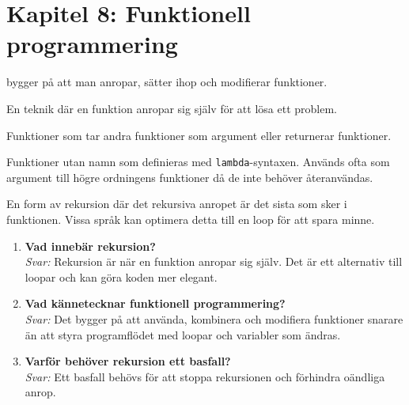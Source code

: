 \documentclass[11pt,a4paper]{article}
\begin{document}
\section{Kapitel 8: Funktionell programmering}

\begin{description}[style=nextline, leftmargin=1cm, labelindent=0.5cm]
    \item[\color{primary}Funktionell programmering] bygger på att man anropar, sätter ihop och modifierar funktioner.
    \item[\color{primary}Rekursion] En teknik där en funktion anropar sig själv för att lösa ett problem.
    \item[\color{primary}Högre ordningens funktioner] Funktioner som tar andra funktioner som argument eller returnerar funktioner.
    \item[\color{primary}Anonyma funktioner (lambda)] Funktioner utan namn som definieras med \texttt{lambda}-syntaxen. Används ofta som argument till högre ordningens funktioner då de inte behöver återanvändas.
    \item[\color{primary}Svansrekursion] En form av rekursion där det rekursiva anropet är det sista som sker i funktionen. Vissa språk kan optimera detta till en loop för att spara minne.
\end{description}

\begin{enumerate}[label=\bfseries\color{primary}Fråga \arabic*:, leftmargin=1.8cm]
    \item \textbf{Vad innebär rekursion?}
    \\ \textit{Svar:} Rekursion är när en funktion anropar sig själv. Det är ett alternativ till loopar och kan göra koden mer elegant.
    
    \item \textbf{Vad kännetecknar funktionell programmering?}
    \\ \textit{Svar:} Det bygger på att använda, kombinera och modifiera funktioner snarare än att styra programflödet med loopar och variabler som ändras.

    \item \textbf{Varför behöver rekursion ett basfall?}
    \\ \textit{Svar:} Ett basfall behövs för att stoppa rekursionen och förhindra oändliga anrop.

\end{enumerate}
\end{document}
